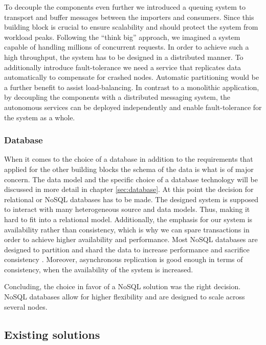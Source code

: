 To decouple the components even further we introduced a queuing system
to transport and buffer messages between the importers and consumers.
Since this building block is crucial to ensure scalability and should
protect the system from workload peaks. Following the ``think big''
approach, we imagined a system capable of handling millions of
concurrent requests. In order to achieve such a high throughput, the
system has to be designed in a distributed manner. To additionally
introduce fault-tolerance we need a service that replicates data
automatically to compensate for crashed nodes. Automatic partitioning
would be a further benefit to assist load-balancing. In contrast to a
monolithic application, by decoupling the components with a distributed
messaging system, the autonomous services can be deployed independently
and enable fault-tolerance for the system as a whole.

\subsubsection{Database}\label{database}

When it comes to the choice of a database in addition to the
requirements that applied for the other building blocks the schema of
the data is what is of major concern. The data model and the specific
choice of a database technology will be discussed in more detail in
chapter \ref{sec:database}. At this point the decision for relational or
NoSQL databases has to be made. The designed system is supposed to
interact with many heterogeneous source and data models. Thus, making it
hard to fit into a relational model. Additionally, the emphasis for our
system is availability rather than consistency, which is why we can
spare transactions in order to achieve higher availability and
performance. Most NoSQL databases are designed to partition and shard
the data to increase performance and sacrifice consistency \cite{Chatzakis.2016}.
Moreover, asynchronous replication is good enough in terms of
consistency, when the availability of the system is increased.

Concluding, the choice in favor of a NoSQL solution was the right
decision. NoSQL databases allow for higher flexibility and are designed
to scale across several nodes.

\subsection{Existing solutions}\label{existing-solutions}

